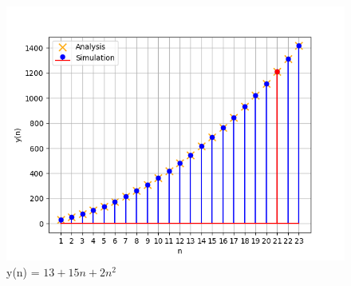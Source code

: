 \documentclass[journal,12pt,twocolumn]{IEEEtran}
\theoremstyle{remark}
\begin{document}
\begin{figure}[h]
  \centering
  \includegraphics[width=\columnwidth]{figs/fig1.png}
  \caption{y(n) = $13 + 15n+2n^2$}
  \label{fig:graph}
\end{figure}
\end{document}
